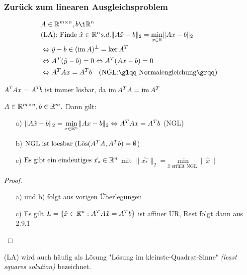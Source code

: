\subsubsection{Zurück zum linearen Ausgleichsproblem}
\begin{align*}
&A \in \RR^{m \times n}, b \i \RR^n\\
&\text{(LA): Finde } \hat{x} \in \RR^n s.d. \|A\hat{x}-b\|_2 = \underset{x \in \RR}{\mathrm{min}}\|Ax-b\|_2\\
&\Leftrightarrow \hat{y}-b \in (\im A)^{\perp} = \ker A^T\\
&\Leftrightarrow A^T(\hat{y}-b)=0 \Leftrightarrow A^T(Ax-b)=0\\
&\Leftrightarrow A^TAx=A^Tb \quad \text{(NGL:\glqq Normalengleichung\grqq)}
\end{align*}
\begin{Bemerkung}
$A^TAx=A^Tb$ ist immer lösbar, da $\operatorname*{\mathrm{im}} A^TA=\operatorname*{\mathrm{im}} A^T$
\end{Bemerkung}
\begin{Satz}
$A \in \mathbb R^{m \times n}, b \in \mathbb R^m.$ Dann gilt:
\begin{itemize}
\item[a)]$\|A\hat{x}-b\|_2= \underset{x \in \mathbb R^n}{\mathrm{min}}\|Ax-b\|_2 \Leftrightarrow A^TAx=A^Tb$ (NGL)
\item[b)] $\mathrm{NGL\;ist\;loesbar\;} (\mathrm{L\ddot{o}s}(A^TA,A^Tb) = \emptyset$)
\item[c)] $\mathrm{Es\;gibt\;ein\;eindeutiges\;} \hat{x_{*}} \in \mathbb R^n$ mit $ \|\hat{x_{*}}\|_2 = \underset{\hat{x} \text{ erfüllt NGL }}{\mathrm{min}}\|\hat{x}\|$
\end{itemize}
\end{Satz}
\begin{proof}
	\begin{itemize}
		\item[a) und b)] folgt aus vorigen Überlegungen
		\item[c)] Es gilt $L=\{\hat{x}\in \mathbb R^n:A^TA\hat{x}=A^Tb\}$ ist affiner UR, Rest folgt dann aus 2.9.1
	\end{itemize}
\end{proof}
\begin{Bemerkung}
	(LA) wird auch häufig als Lösung "Lösung im kleinste-Quadrat-Sinne"
	\textit{(least squares solution)} bezeichnet.
\end{Bemerkung}
